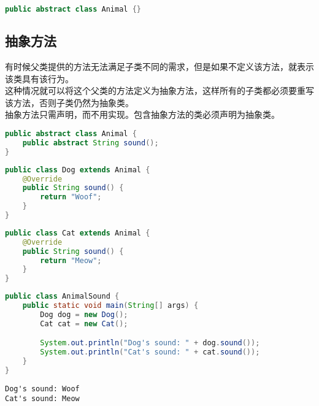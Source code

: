 \begin{lstlisting}[language=Java]
public abstract class Animal {}
\end{lstlisting}

\vspace{0.5cm}

\subsection{抽象方法}

有时候父类提供的方法无法满足子类不同的需求，但是如果不定义该方法，就表示该类具有该行为。\\

这种情况就可以将这个父类的方法定义为抽象方法，这样所有的子类都必须要重写该方法，否则子类仍然为抽象类。\\

抽象方法只需声明，而不用实现。包含抽象方法的类必须声明为抽象类。\\


\begin{lstlisting}[language=Java]
public abstract class Animal {
    public abstract String sound();
}
\end{lstlisting}

\begin{lstlisting}[language=Java]
public class Dog extends Animal {
    @Override
    public String sound() {
        return "Woof";
    }
}
\end{lstlisting}

\begin{lstlisting}[language=Java]
public class Cat extends Animal {
    @Override
    public String sound() {
        return "Meow";
    }
}
\end{lstlisting}

\begin{lstlisting}[language=Java]
public class AnimalSound {
    public static void main(String[] args) {
        Dog dog = new Dog();
        Cat cat = new Cat();

        System.out.println("Dog's sound: " + dog.sound());
        System.out.println("Cat's sound: " + cat.sound());
    }
}
\end{lstlisting}

\begin{tcolorbox}
    \begin{verbatim}
Dog's sound: Woof
Cat's sound: Meow
	\end{verbatim}
\end{tcolorbox}

